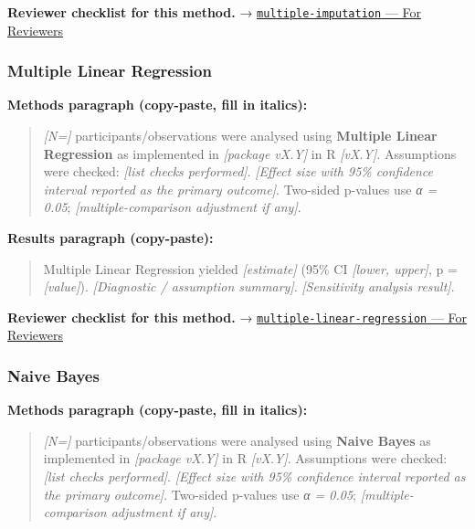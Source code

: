 \documentclass[
]{article}
\begin{document}
\textbf{Reviewer checklist for this method.} →
\href{../chapters/14-clinical/multiple-imputation.Rmd\#for-reviewers}{\texttt{multiple-imputation}
--- For Reviewers}

\subsubsection{Multiple Linear
Regression}\label{multiple-linear-regression}

\textbf{Methods paragraph (copy-paste, fill in italics):}

\begin{quote}
\emph{{[}N={]}} participants/observations were analysed using
\textbf{Multiple Linear Regression} as implemented in \emph{{[}package
vX.Y{]}} in R \emph{{[}vX.Y{]}}. Assumptions were checked: \emph{{[}list
checks performed{]}}. \emph{{[}Effect size with 95\% confidence interval
reported as the primary outcome{]}}. Two-sided p-values use \emph{α =
0.05}; \emph{{[}multiple-comparison adjustment if any{]}}.
\end{quote}

\textbf{Results paragraph (copy-paste):}

\begin{quote}
Multiple Linear Regression yielded \emph{{[}estimate{]}} (95\% CI
\emph{{[}lower, upper{]}}, p = \emph{{[}value{]}}). \emph{{[}Diagnostic
/ assumption summary{]}}. \emph{{[}Sensitivity analysis result{]}}.
\end{quote}

\textbf{Reviewer checklist for this method.} →
\href{../chapters/07-regression/multiple-linear-regression.Rmd\#for-reviewers}{\texttt{multiple-linear-regression}
--- For Reviewers}

\subsubsection{Naive Bayes}\label{naive-bayes}

\textbf{Methods paragraph (copy-paste, fill in italics):}

\begin{quote}
\emph{{[}N={]}} participants/observations were analysed using
\textbf{Naive Bayes} as implemented in \emph{{[}package vX.Y{]}} in R
\emph{{[}vX.Y{]}}. Assumptions were checked: \emph{{[}list checks
performed{]}}. \emph{{[}Effect size with 95\% confidence interval
reported as the primary outcome{]}}. Two-sided p-values use \emph{α =
0.05}; \emph{{[}multiple-comparison adjustment if any{]}}.
\end{quote}
\end{document}
